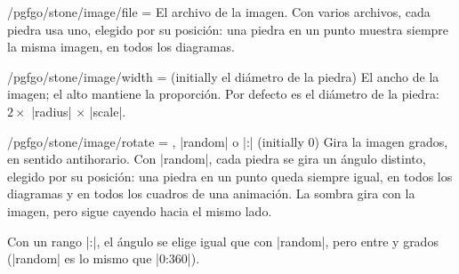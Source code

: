 \begin{key}{/pgfgo/stone/image/file = }
	El archivo de la imagen. Con varios archivos, cada piedra usa uno, elegido por su posición: una piedra en un punto muestra siempre la misma imagen, en todos los diagramas.

	\begin{codeexample}[]
		\begin{goban}[5, partial = B2:D4]
		\end{goban}
	\end{codeexample}
\end{key}

\begin{key}{/pgfgo/stone/image/width =  (initially el diámetro de la piedra)}
	El ancho de la imagen; el alto mantiene la proporción. Por defecto es el diámetro de la piedra: $2 \times$ |radius| $\times$ |scale|.
\end{key}

\begin{key}{/pgfgo/stone/image/rotate = , |random| o |:| (initially 0)}
	Gira la imagen  grados, en sentido antihorario. Con |random|, cada piedra se gira un ángulo distinto, elegido por su posición: una piedra en un punto queda siempre igual, en todos los diagramas y en todos los cuadros de una animación. La sombra gira con la imagen, pero sigue cayendo hacia el mismo lado.

	\begin{codeexample}[]
		\begin{goban}[5, partial = B2:D4]
		\end{goban}
	\end{codeexample}

	Con un rango |:|, el ángulo se elige igual que con |random|, pero entre  y  grados (|random| es lo mismo que |0:360|).

	\begin{codeexample}[]
		\begin{goban}[5, partial = B2:D4]
		\end{goban}
	\end{codeexample}
\end{key}

